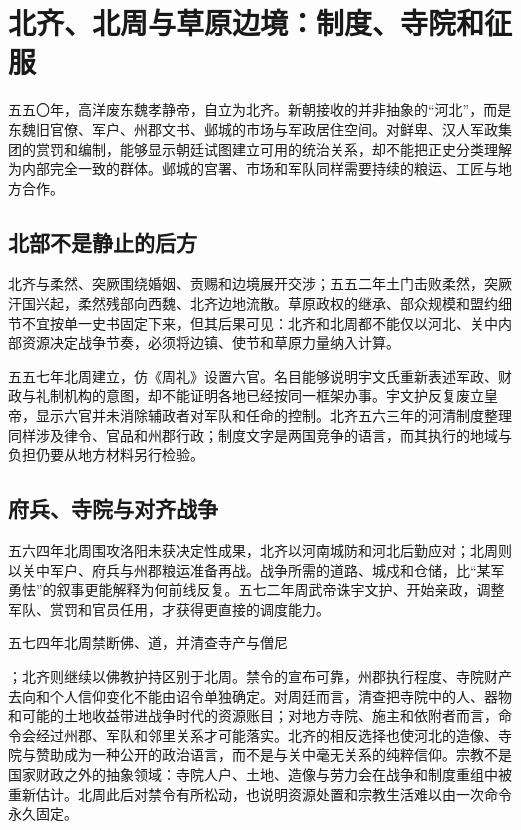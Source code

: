\section{北齐、北周与草原边境：制度、寺院和征服}
\label{sec:north-qi-north-zhou-frontiers-religion}

五五〇年，高洋废东魏孝静帝，自立为北齐。新朝接收的并非抽象的“河北”，而是东魏旧官僚、军户、州郡文书、邺城的市场与军政居住空间。对鲜卑、汉人军政集团的赏罚和编制，能够显示朝廷试图建立可用的统治关系，却不能把正史分类理解为内部完全一致的群体。邺城的宫署、市场和军队同样需要持续的粮运、工匠与地方合作。

\subsection{北部不是静止的后方}

北齐与柔然、突厥围绕婚姻、贡赐和边境展开交涉；五五二年土门击败柔然，突厥汗国兴起，柔然残部向西魏、北齐边地流散。草原政权的继承、部众规模和盟约细节不宜按单一史书固定下来，但其后果可见：北齐和北周都不能仅以河北、关中内部资源决定战争节奏，必须将边镇、使节和草原力量纳入计算。

五五七年北周建立，仿《周礼》设置六官。名目能够说明宇文氏重新表述军政、财政与礼制机构的意图，却不能证明各地已经按同一框架办事。宇文护反复废立皇帝，显示六官并未消除辅政者对军队和任命的控制。北齐五六三年的河清制度整理同样涉及律令、官品和州郡行政；制度文字是两国竞争的语言，而其执行的地域与负担仍要从地方材料另行检验。

\subsection{府兵、寺院与对齐战争}

五六四年北周围攻洛阳未获决定性成果，北齐以河南城防和河北后勤应对；北周则以关中军户、府兵与州郡粮运准备再战。战争所需的道路、城戍和仓储，比“某军勇怯”的叙事更能解释为何前线反复。五七二年周武帝诛宇文护、开始亲政，调整军队、赏罚和官员任用，才获得更直接的调度能力。

\hypertarget{evt:NSL-440-589-253}{\textcolor{dynasty}{五七四年北周禁断佛、道，并清查寺产与僧尼}}；北齐则继续以佛教护持区别于北周。禁令的宣布可靠，州郡执行程度、寺院财产去向和个人信仰变化不能由诏令单独确定。对周廷而言，清查把寺院中的人、器物和可能的土地收益带进战争时代的资源账目；对地方寺院、施主和依附者而言，命令会经过州郡、军队和邻里关系才可能落实。北齐的相反选择也使河北的造像、寺院与赞助成为一种公开的政治语言，而不是与关中毫无关系的纯粹信仰。宗教不是国家财政之外的抽象领域：寺院人户、土地、造像与劳力会在战争和制度重组中被重新估计。北周此后对禁令有所松动，也说明资源处置和宗教生活难以由一次命令永久固定。

